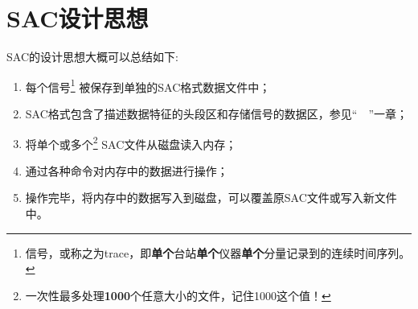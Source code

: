 \section{SAC设计思想}
SAC的设计思想大概可以总结如下:
\begin{enumerate}
    \item 每个信号\footnote{信号，或称之为trace，即\textbf{单个}台站\textbf{单个}仪器\textbf{单个}分量记录到的连续时间序列。}
被保存到单独的SAC格式数据文件中；
\item SAC格式包含了描述数据特征的头段区和存储信号的数据区，参见``~~''一章；
\item 将单个或多个\footnote{一次性最多处理\textbf{1000}个任意大小的文件，记住1000这个值！}
    SAC文件从磁盘读入内存；
\item 通过各种命令对内存中的数据进行操作；
\item 操作完毕，将内存中的数据写入到磁盘，可以覆盖原SAC文件或写入新文件中。
\end{enumerate}
